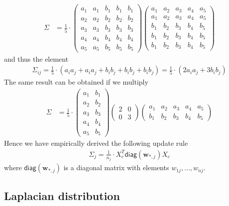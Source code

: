 \documentclass{article}
\renewcommand{\vec}[1]{\boldsymbol{#1}}
\begin{document}
\begin{align*}
\Sigma&=
\frac{1}{5}\cdot
\begin{pmatrix}
a_1 & a_1 & b_1 & b_1 & b_1\\ 
a_2 & a_2 & b_2 & b_2 & b_2\\
a_3 & a_3 & b_3 & b_3 & b_3\\
a_4 & a_4 & b_4 & b_4 & b_4\\ 
a_5 & a_5 & b_5 & b_5 & b_5
\end{pmatrix}
\begin{pmatrix}
a_1 & a_2 & a_3 & a_4 & a_5\\
a_1 & a_2 & a_3 & a_4 & a_5\\
b_1 & b_2 & b_3 & b_4 & b_5\\
b_1 & b_2 & b_3 & b_4 & b_5\\
b_1 & b_2 & b_3 & b_4 & b_5
\end{pmatrix}
\end{align*}
and thus the element
\begin{align*}
\Sigma_{ij}=\frac{1}{5}\cdot(a_ia_j+ a_ia_j + b_ib_j + b_ib_j + b_ib_j)=\frac{1}{5}\cdot(2a_ia_j+ 3b_ib_j)
\end{align*}
The same result can be obtained if we multiply
\begin{align*}
\Sigma&=
\frac{1}{5}\cdot
\begin{pmatrix}
a_1 & b_1\\ 
a_2 & b_2\\
a_3 & b_3\\
a_4 & b_4\\ 
a_5 & b_5
\end{pmatrix}
\begin{pmatrix}
 2 &0\\
 0 &3
\end{pmatrix}
\begin{pmatrix}
a_1 & a_2 & a_3 & a_4 & a_5\\
b_1 & b_2 & b_3 & b_4 & b_5
\end{pmatrix}
\end{align*}
Hence we have empirically derived the following update rule
\begin{align*}
\Sigma_j=\frac{1}{n_j}\cdot X_c^T\mathsf{diag}(\vec{w}_{*,j}) X_c
\end{align*}
where $\mathsf{diag}(\vec{w}_{*,j})$ is a diagonal matrix with elements $w_{1j},\ldots, w_{nj}$.
   
\subsection{Laplacian distribution}
\end{document}
